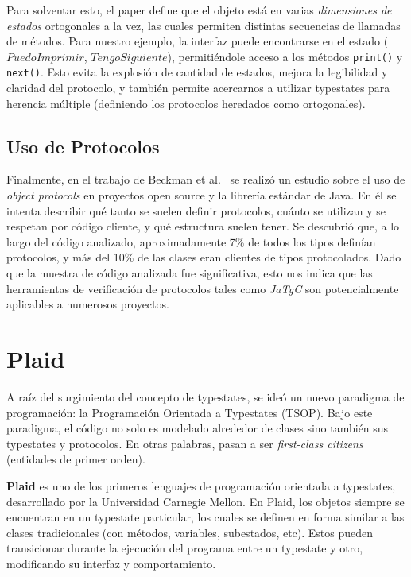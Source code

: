 Para solventar esto, el paper define que el objeto está en varias \textit{dimensiones de estados} ortogonales a la vez, las cuales permiten distintas secuencias de llamadas de métodos. Para nuestro ejemplo, la interfaz puede encontrarse en el estado ($\mathit{PuedoImprimir}$, $\mathit{TengoSiguiente}$), permitiéndole acceso a los métodos \texttt{print()} y \texttt{next()}. Esto evita la explosión de cantidad de estados, mejora la legibilidad y claridad del protocolo, y también permite acercarnos a utilizar typestates para herencia múltiple (definiendo los protocolos heredados como ortogonales).

\subsection{Uso de Protocolos}

Finalmente, en el trabajo de Beckman et al.~\cite{empirical} se realizó un estudio sobre el uso de \textit{object protocols} en proyectos open source y la librería estándar de Java. En él se intenta describir qué tanto se suelen definir protocolos, cuánto se utilizan y se respetan por código cliente, y qué estructura suelen tener. Se descubrió que, a lo largo del código analizado, aproximadamente 7\% de todos los tipos definían protocolos, y más del 10\% de las clases eran clientes de tipos protocolados. Dado que la muestra de código analizada fue significativa, esto nos indica que las herramientas de verificación de protocolos tales como \textit{JaTyC} son potencialmente aplicables a numerosos proyectos.


\section{Plaid}

A raíz del surgimiento del concepto de typestates, se ideó un nuevo paradigma de programación: la Programación Orientada a Typestates (TSOP)\cite{tsop}. Bajo este paradigma, el código no solo es modelado alrededor de clases sino también sus typestates y protocolos. En otras palabras, pasan a ser \textit{first-class citizens} (entidades de primer orden).

\textbf{Plaid}\cite{plaid}\cite{plaid:paper} es uno de los primeros lenguajes de programación orientada a typestates, desarrollado por la Universidad Carnegie Mellon. En Plaid, los objetos siempre se encuentran en un typestate particular, los cuales se definen en forma similar a las clases tradicionales (con métodos, variables, subestados, etc). Estos pueden transicionar durante la ejecución del programa entre un typestate y otro, modificando su interfaz y comportamiento.
   
